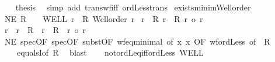 \begin{isabellebody}
\ \ \isamarkupfalse%
\ {\isacharquery}{\kern0pt}thesis\ \isamarkupfalse%
\ {\isacharparenleft}{\kern0pt}simp\ add{\isacharcolon}{\kern0pt}\ trans{\isacharunderscore}{\kern0pt}wf{\isacharunderscore}{\kern0pt}iff\ ordLess{\isacharunderscore}{\kern0pt}trans{\isacharparenright}{\kern0pt}\isanewline
{}\isamarkupfalse%
%
\endisatagproof
{\isafoldproof}%
%
\isadelimproof
\isanewline
%
\endisadelimproof
\isanewline
{}\isamarkupfalse%
\ exists{\isacharunderscore}{\kern0pt}minim{\isacharunderscore}{\kern0pt}Well{\isacharunderscore}{\kern0pt}order{\isacharcolon}{\kern0pt}\isanewline
{}\ NE{\isacharcolon}{\kern0pt}\ {\isachardoublequoteopen}R\ {\isasymnoteq}\ {\isacharbraceleft}{\kern0pt}{\isacharbraceright}{\kern0pt}{\isachardoublequoteclose}\ \ WELL{\isacharcolon}{\kern0pt}\ {\isachardoublequoteopen}{\isasymforall}r\ {\isasymin}\ R{\isachardot}{\kern0pt}\ Well{\isacharunderscore}{\kern0pt}order\ r{\isachardoublequoteclose}\isanewline
{}\ {\isachardoublequoteopen}{\isasymexists}r\ {\isasymin}\ R{\isachardot}{\kern0pt}\ {\isasymforall}r{\isacharprime}{\kern0pt}\ {\isasymin}\ R{\isachardot}{\kern0pt}\ r\ {\isasymle}o\ r{\isacharprime}{\kern0pt}{\isachardoublequoteclose}\isanewline
%
\isadelimproof
%
\endisadelimproof
%
\isatagproof
{}\isamarkupfalse%
{\isacharminus}{\kern0pt}\isanewline
\ \ \isamarkupfalse%
\ r\ \ {\isachardoublequoteopen}r\ {\isasymin}\ R\ {\isasymand}\ {\isacharparenleft}{\kern0pt}{\isasymforall}r{\isacharprime}{\kern0pt}\ {\isasymin}\ R{\isachardot}{\kern0pt}\ {\isasymnot}\ r{\isacharprime}{\kern0pt}\ {\isacharless}{\kern0pt}o\ r{\isacharparenright}{\kern0pt}{\isachardoublequoteclose}\isanewline
\ \ \isamarkupfalse%
\ NE\ spec{\isacharbrackleft}{\kern0pt}OF\ spec{\isacharbrackleft}{\kern0pt}OF\ subst{\isacharbrackleft}{\kern0pt}OF\ wf{\isacharunderscore}{\kern0pt}eq{\isacharunderscore}{\kern0pt}minimal{\isacharcomma}{\kern0pt}\ of\ {\isachardoublequoteopen}{\isacharpercent}{\kern0pt}x{\isachardot}{\kern0pt}\ x{\isachardoublequoteclose}{\isacharcomma}{\kern0pt}\ OF\ wf{\isacharunderscore}{\kern0pt}ordLess{\isacharbrackright}{\kern0pt}{\isacharbrackright}{\kern0pt}{\isacharcomma}{\kern0pt}\ of\ {\isacharunderscore}{\kern0pt}\ R{\isacharbrackright}{\kern0pt}\isanewline
\ \ \ \ equals{}I{\isacharbrackleft}{\kern0pt}of\ R{\isacharbrackright}{\kern0pt}\ \isamarkupfalse%
\ blast\isanewline
\ \ \isamarkupfalse%
\ not{\isacharunderscore}{\kern0pt}ordLeq{\isacharunderscore}{\kern0pt}iff{\isacharunderscore}{\kern0pt}ordLess\ WELL\ \isamarkupfalse%

\end{isabellebody}
